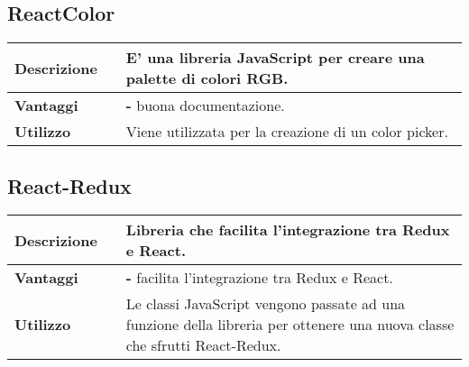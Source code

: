\vspace{40px}
\subsection{ReactColor}
\label{ReactColor}
\begin{table}[H]
	\centering
	\begin{tabular}{p{2cm}p{0.5cm}p{11.5cm}}
		\arrayrulecolor{lightgray}
		\toprule
		\textbf{Descrizione} & &
		E' una libreria JavaScript per creare una palette di colori RGB.
		\\ \midrule
		\textbf{Vantaggi} & &
		\textbf{- }buona documentazione.
		\\ \midrule
		\textbf{Utilizzo} & &
		Viene  utilizzata per la creazione di un color picker.
		\\ \bottomrule
	\end{tabular}
\end{table}



\vspace{40px}
\subsection{React-Redux}
\label{React-Redux}
\begin{table}[H]
	\centering
	\begin{tabular}{p{2cm}p{0.5cm}p{11.5cm}}
		\arrayrulecolor{lightgray}
		\toprule
		\textbf{Descrizione} & &
		Libreria che facilita l'integrazione tra Redux e React.
		\\ \midrule
		\textbf{Vantaggi} & &
		\textbf{- }facilita l'integrazione tra Redux e React.
		\\ \midrule
		\textbf{Utilizzo} & &
		Le classi JavaScript vengono passate ad una funzione della libreria per ottenere una nuova classe che sfrutti React-Redux.
		\\ \bottomrule
	\end{tabular}
\end{table}



\vspace{40px}
